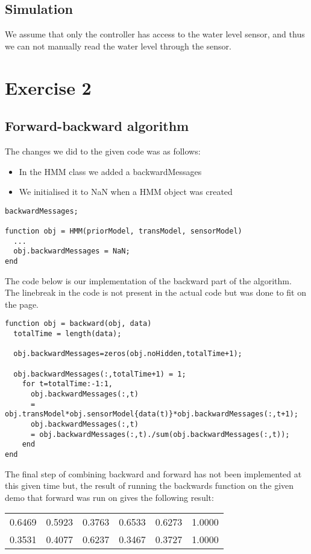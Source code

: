 \documentclass[colorlinks=true,linkcolor=blue]{article}
\begin{document}
\subsection{Simulation}
\label{sec-1-3}
We assume that only the controller has access to the water level sensor, and thus we can not manually read the water level through the sensor.

\section{Exercise 2}
\label{sec-2}
\subsection{Forward-backward algorithm}
\label{sec-2-1}
The changes we did to the given code was as follows:
\begin{itemize}
\item In the HMM class we added a backwardMessages
\item We initialised it to NaN when a HMM object was created
\end{itemize}
\begin{verbatim}
backwardMessages;

function obj = HMM(priorModel, transModel, sensorModel)
  ...
  obj.backwardMessages = NaN;
end
\end{verbatim}

The code below is our implementation of the backward part of the algorithm. The linebreak in the code is not present in the actual code but was done to fit on the page.

\begin{verbatim}
function obj = backward(obj, data)
  totalTime = length(data);

  obj.backwardMessages=zeros(obj.noHidden,totalTime+1);           

  obj.backwardMessages(:,totalTime+1) = 1;
    for t=totalTime:-1:1,
      obj.backwardMessages(:,t) 
      = obj.transModel*obj.sensorModel{data(t)}*obj.backwardMessages(:,t+1);
      obj.backwardMessages(:,t) 
      = obj.backwardMessages(:,t)./sum(obj.backwardMessages(:,t));
    end
end
\end{verbatim}
The final step of combining backward and forward has not been implemented at this given time but, the result of running the backwards function on the given demo that forward was run on gives the following result:

\begin{center}
\begin{tabular}{rrrrrr}
0.6469 & 0.5923 & 0.3763 & 0.6533 & 0.6273 & 1.0000\\
0.3531 & 0.4077 & 0.6237 & 0.3467 & 0.3727 & 1.0000\\
\end{tabular}
\end{center}
\end{document}
